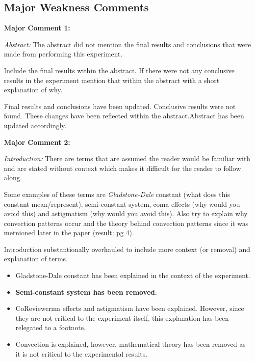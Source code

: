 \documentclass[%
 aip,
cp,  %
 amsmath,amssymb,
 reprint,%
]{revtex4-2}
\begin{document}
    \subsection{Major Weakness Comments}
        \begin{mdframed} \textbf{Major Comment 1:}

            \textit{Abstract:} The abstract did not mention the final results and conclusions that were made from performing this experiment.

            Include the final results within the abstract. If there were not any conclusive results in the experiment mention that within the abstract with a short explanation of why.
        \end{mdframed}
        {\color{red}
        
        Final results and conclusions have been updated. Conclusive results were not found. These changes have been reflected within the abstract.Abstract has been updated accordingly.

        }
        \begin{mdframed} \textbf{Major Comment 2:}

            \textit{Introduction:} There are terms that are assumed the reader would be familiar with and are stated without context which makes it difficult for the reader to follow along.

            Some examples of these terms are \textit{Gladstone-Dale} constant (what does this constant mean/represent), semi-constant system, coma effects (why would you avoid this) and astigmatism (why would you avoid this). Also try to explain why convection patterns occur and the theory behind convection patterns since it was metnioned later in the paper (result: pg 4).
        \end{mdframed}
        {\color{red}
        
        Introduction substantionally overhauled to include more context (or removal) and explanation of terms. 
        
        \begin{itemize}
            \item Gladstone-Dale constant has been explained in the context of the experiment.
            \item \textbf{Semi-constant system has been removed.}
            \item CoReviewerma effects and astigmatism have been explained. However, since they are not critical to the experiment itself, this explanation has been relegated to a footnote.
            \item Convection is explained, however, mathematical theory has been removed as it is not critical to the experimental results.
        \end{itemize}

        }
\end{document}
